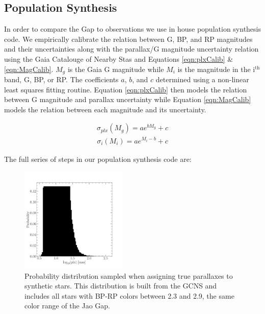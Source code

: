 \subsection{Population Synthesis}
In order to compare the Gap to observations we use in house population
synthesis code. We empirically calibrate the relation between G, BP, and RP
magnitudes and their uncertainties along with the parallax/G magnitude
uncertainty relation using the Gaia Catalouge of Nearby Stas
\citep[GCNS,][]{GaiaCollaboration2021} and Equations \ref{eqn:plxCalib} \&
\ref{eqn:MagCalib}. $M_{g}$ is the Gaia G magnitude while $M_{i}$ is the
magnitude in the i$^\text{th}$ band, G, BP, or RP. The coefficients $a$, $b$,
and $c$ determined using a non-linear least squares fitting routine. Equation
\ref{eqn:plxCalib} then models the relation between G magnitude and parallax
uncertainty while Equation \ref{eqn:MagCalib} models the relation between each
magnitude and its uncertainty.

\begin{align}\label{eqn:plxCalib}
	\sigma_{plx}(M_{g}) = ae^{bM_{g}}+c
\end{align}
\begin{align}\label{eqn:MagCalib}
	\sigma_{i}(M_{i}) = ae^{M_{i}-b}+c
\end{align}

\noindent The full series of steps in our population synthesis code
are:

\begin{figure}
	\centering
	\includegraphics[width=0.45\textwidth]{pdist.pdf}
	\caption{Probability distribution sampled when assigning true parallaxes to
	synthetic stars. This distribution is built from the GCNS and includes all
	stars with BP-RP colors between 2.3 and 2.9, the same color range
	of the Jao Gap.}
	\label{fig:pdist}
\end{figure}

